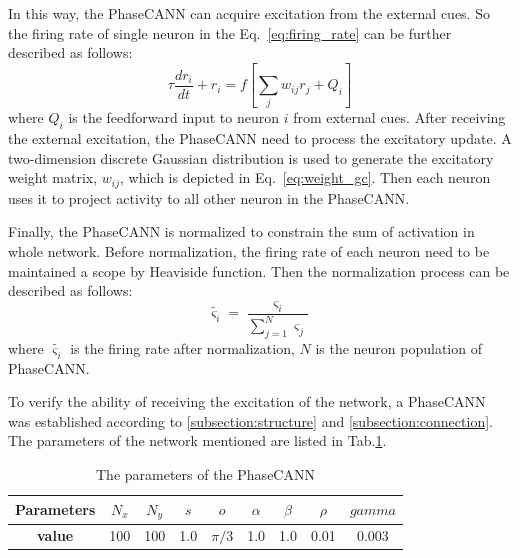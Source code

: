 \documentclass[final,5p,times,twocolumn]{elsarticle}
\begin{document}
In this way, the PhaseCANN can acquire excitation from the external cues. So the firing rate of single neuron in the Eq.~\eqref{eq:firing_rate} can be further described as follows:
\begin{equation}\label{eq:firing_rate_modify}
	\tau \frac{d r_{i}}{d t}+r_{i}=f\left[\sum_{j} w_{i j} r_{j} + Q_i\right]
\end{equation}
where $Q_i$ is the feedforward input to neuron $i$ from external cues. After receiving the external excitation, the PhaseCANN need to process the excitatory update. A two-dimension discrete Gaussian distribution is used to generate the excitatory weight matrix, $w_{ij}$, which is depicted in Eq.~\eqref{eq:weight_gc}. Then each neuron uses it to project activity to all other neuron in the PhaseCANN.

Finally, the PhaseCANN is normalized to constrain the sum of activation in whole network. Before normalization, the firing rate of each neuron need to be maintained a scope by Heaviside function. Then the normalization process can be described as follows:
\begin{equation}\label{eq:normalization}
	\tilde{\varsigma_i} = \frac{\varsigma_i}{\sum_{j=1}^{N} \varsigma_j}
\end{equation}
where $\tilde{\varsigma_i}$ is the firing rate after normalization, $N$ is the neuron population of PhaseCANN.



To verify the ability of receiving the excitation of the network, a PhaseCANN was established according to \ref{subsection:structure} and \ref{subsection:connection}. The parameters of the network mentioned are listed in Tab.\ref{tab:model_parameter}.

\begin{table}[h]
	\centering
	\caption{The parameters of the PhaseCANN}
	\label{tab:model_parameter}
	\begin{tabular}{c c c c c c c c c }		
		\toprule
		\textbf{Parameters}&$N_x$& $N_y$&$s$ &$o$ &$\alpha$ &$\beta$ &$\rho$ &$gamma$ \\
		\midrule
		\textbf{value}&100&100&1.0&$\pi/3$&1.0&1.0&0.01&0.003\\
		\bottomrule
	\end{tabular}
\end{table}
\end{document}
